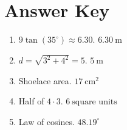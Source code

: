 \documentclass[12pt]{article}
\begin{document}
\section*{Answer Key}
\begin{enumerate}
  \item $9\tan(35^\circ) \approx 6.30$. \quad $\boxed{6.30\ \text{m}}$
  \item $d = \sqrt{3^2 + 4^2} = 5$. \quad $\boxed{5\ \text{m}}$
  \item Shoelace area. \quad $\boxed{17\ \text{cm}^2}$
  \item Half of $4 \cdot 3$. \quad $\boxed{6\ \text{square units}}$
  \item Law of cosines. \quad $\boxed{48.19^\circ}$
\end{enumerate}
\end{document}
